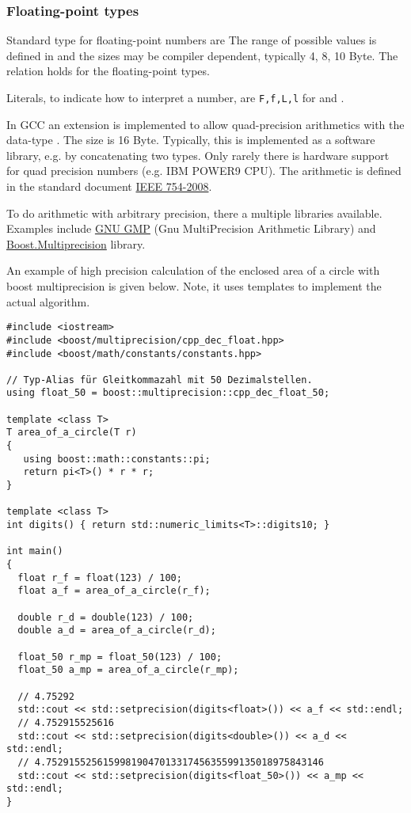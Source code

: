 \subsubsection{Floating-point types}
Standard type for floating-point numbers are
%
%
The range of possible values is defined in  and the sizes may be compiler dependent, typically 4, 8, 10 Byte. The relation
%
%
holds for the floating-point types.

Literals, to indicate how to interpret a number, are \texttt{F,f,L,l} for  and .

\begin{rem}
  In GCC an extension is implemented to allow quad-precision arithmetics with the data-type . The size is 16 Byte. Typically, this
  is implemented as a software library, e.g. by concatenating two  types. Only rarely there is hardware support for quad precision
  numbers (e.g. IBM POWER9 CPU). The arithmetic is defined in the standard document \href{https://doi.org/10.1109%2FIEEESTD.2008.4610935}{IEEE 754-2008}.
\end{rem}

\begin{rem}
  To do arithmetic with arbitrary precision, there a multiple libraries available. Examples include \href{https://gmplib.org/}{GNU GMP}
  (Gnu MultiPrecision Arithmetic Library) and \href{https://www.boost.org/doc/libs/1_71_0/libs/multiprecision/doc/html/index.html}{Boost.Multiprecision} library.

  An example of high precision calculation of the enclosed area of a circle with boost multiprecision is given below. Note, it uses templates to
  implement the actual algorithm.
\end{rem}
\begin{verbatim}
#include <iostream>
#include <boost/multiprecision/cpp_dec_float.hpp>
#include <boost/math/constants/constants.hpp>

// Typ-Alias für Gleitkommazahl mit 50 Dezimalstellen.
using float_50 = boost::multiprecision::cpp_dec_float_50;

template <class T>
T area_of_a_circle(T r)
{
   using boost::math::constants::pi;
   return pi<T>() * r * r;
}

template <class T>
int digits() { return std::numeric_limits<T>::digits10; }

int main()
{
  float r_f = float(123) / 100;
  float a_f = area_of_a_circle(r_f);

  double r_d = double(123) / 100;
  double a_d = area_of_a_circle(r_d);

  float_50 r_mp = float_50(123) / 100;
  float_50 a_mp = area_of_a_circle(r_mp);

  // 4.75292
  std::cout << std::setprecision(digits<float>()) << a_f << std::endl;
  // 4.752915525616
  std::cout << std::setprecision(digits<double>()) << a_d << std::endl;
  // 4.7529155256159981904701331745635599135018975843146
  std::cout << std::setprecision(digits<float_50>()) << a_mp << std::endl;
}
\end{verbatim}


